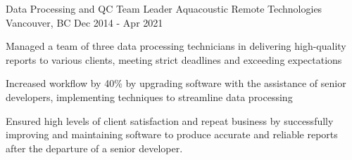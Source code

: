 \begin{cventries}
  \cventry
    {Data Processing and QC Team Leader} %
    {Aquacoustic Remote Technologies} %
    {Vancouver, BC} %
    {Dec 2014 - Apr 2021} %
    {
      \begin{cvitems} %
        \item{Managed a team of three data processing technicians in delivering high-quality reports to various clients, meeting strict deadlines and exceeding expectations}
        \item{Increased workflow by 40\% by upgrading software with the assistance of senior developers, implementing techniques to streamline data processing}
        \item{Ensured high levels of client satisfaction and repeat business by successfully improving and maintaining software to produce accurate and reliable reports after the departure of a senior developer.}
      \end{cvitems}
    }

\end{cventries}
